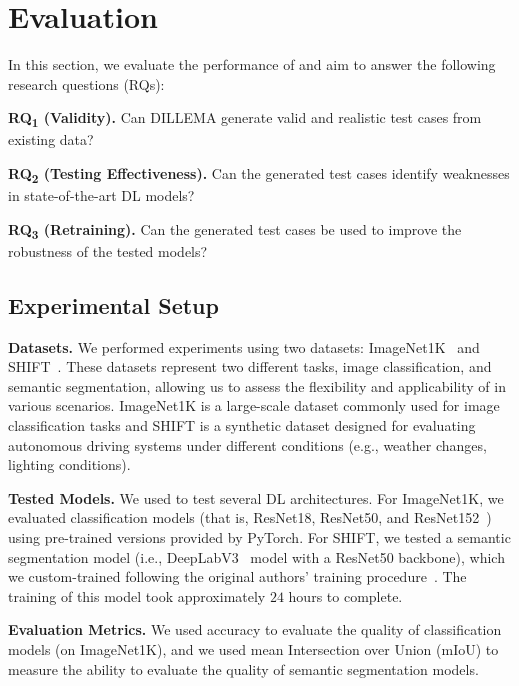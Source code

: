 \section{Evaluation}
\label{sec:eval}

In this section, we evaluate the performance of \approach and aim to answer the following research questions (RQs):

\noindent\textbf{RQ\textsubscript{1} (Validity).} Can DILLEMA generate valid and realistic test cases from existing data?

\noindent\textbf{RQ\textsubscript{2} (Testing Effectiveness).} Can the generated test cases identify weaknesses in state-of-the-art DL models?

\noindent\textbf{RQ\textsubscript{3} (Retraining).} Can the generated test cases be used to improve the robustness of the tested models?

\subsection{Experimental Setup}
\label{sec:eval:setup}
\noindent\textbf{Datasets.} We performed experiments using two datasets: ImageNet1K~\cite{DBLP:conf/cvpr/DengDSLL009} and SHIFT~\cite{DBLP:conf/cvpr/SunSPWGSTY22}. These datasets represent two different tasks, image classification, and semantic segmentation, allowing us to assess the flexibility and applicability of \approach in various scenarios. ImageNet1K is a large-scale dataset commonly used for image classification tasks and SHIFT is a synthetic dataset designed for evaluating autonomous driving systems under different conditions (e.g., weather changes, lighting conditions).

\noindent\textbf{Tested Models.} We used \approach to test several DL architectures.
For ImageNet1K, we evaluated classification models (that is, ResNet18, ResNet50, and ResNet152~\cite{DBLP:conf/cvpr/HeZRS16}) using pre-trained versions provided by PyTorch. For SHIFT, we tested a semantic segmentation model (i.e., DeepLabV3~\cite{DBLP:conf/eccv/ChenZPSA18} model with a ResNet50 backbone), which we custom-trained following the original authors' training procedure~\cite{DBLP:conf/eccv/ChenZPSA18}. The training of this model took approximately $24$ hours to complete.

\noindent\textbf{Evaluation Metrics.} We used accuracy to evaluate the quality of classification models (on ImageNet1K), and we used mean Intersection over Union (mIoU) to measure the ability to evaluate the quality of semantic segmentation models.

